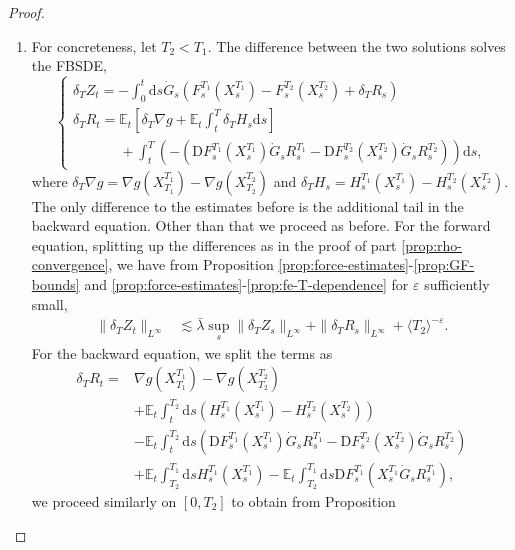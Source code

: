 \documentclass[11pt, a4paper]{scrartcl}
\numberwithin{equation}{section}
\theoremstyle{plain}
\theoremstyle{remark}
\newcommand{\mathD}{\mathrm{D}}
\newcommand{\mathd}{\mathrm{d}}
\newenvironment{enumeratealpha}{\begin{enumerate}[a{\textup{)}}] }{\end{enumerate}}
\begin{document}
\begin{proof}
\begin{enumeratealpha}
    \item For concreteness, let $T_2 < T_1$. The difference between the two
    solutions solves the FBSDE,
    \[ \begin{cases}
         \delta_T Z_t = - \int_0^t \mathd s \dot{G}_s (F_s^{T_1} (X^{T_1}_s) -
         F_s^{T_2} (X^{T_2}_s) + \delta_T R_s)\\
         \delta_T R_t =\mathbb{E}_t \left[ \delta_T \nabla g + 
         \mathbb{E}_t\int_t^T \delta_T H_s\mathd s\right]\\
         \phantom{\delta_T R_t =}+\int_t^T\left( -( \mathD F_s^{T_1} \left(
         X_s^{T_1} \right)  \dot{G}_s R_s^{T_1} - \mathD F_s^{T_2} (X_s^{T_2})
         \dot{G}_s R_s^{T_2}) \right) \mathd s,
       \end{cases} \]
    where $\delta_T \nabla g = \nabla g (X^{T_1}_{T_1}) - \nabla g (X^{T_2}_{T_2})$
    and $\delta_T H_s = H_s^{T_1} (X^{T_1}_s) - H_s^{T_2} (X^{T_2}_s)$. The
    only difference to the estimates before is the additional tail in the
    backward equation. Other than that we proceed as before. For the forward
    equation, splitting up the differences as in the proof of part
    \ref{prop:rho-convergence}, we have from Proposition
    \ref{prop:force-estimates}-\ref{prop:GF-bounds}
    and \ref{prop:force-estimates}-\ref{prop:fe-T-dependence} for $\varepsilon$ sufficiently small,
    \[ \begin{aligned}
         \| \delta_T Z_t \|_{L^{\infty}} & \lesssim  \bar{\lambda} \sup_s \|
         \delta_T Z_s \|_{L^{\infty}} + \| \delta_T R_s \|_{L^{\infty}} +
         \langle T_2 \rangle^{- \varepsilon}.
       \end{aligned} \]
    For the backward equation, we split the terms as
    \[ \begin{aligned}
         \delta_T R_t = & \nabla g (X^{T_1}_{T_1}) - \nabla g
         (X^{T_2}_{T_2})\\
         & +\mathbb{E}_t  \int_t^{T_2} \mathd s (H_s^{T_1} (X^{T_1}_s) -
         H_s^{T_2} (X^{T_2}_s)) \\
         & -\mathbb{E}_t  \int_t^{T_2} \mathd s (\mathD
         F_s^{T_1} (X_s^{T_1})  \dot{G}_s R_s^{T_1} - \mathD F_s^{T_2}
         (X_s^{T_2})  \dot{G}_s R_s^{T_2})\\
         & +\mathbb{E}_t  \int_{T_2}^{T_1} \mathd s H_s^{T_1}
         (X^{T_1}_s) -\mathbb{E}_t  \int_{T_2}^{T_1} \mathd s \mathD
         F_s^{T_1} (X_s^{T_1}  \dot{G}_s R_s^{T_1}),
       \end{aligned} \]
    we proceed similarly on $[0, T_2]$ to obtain from Proposition

\end{enumeratealpha}
\end{proof}
\end{document}
